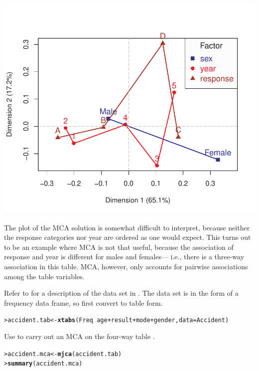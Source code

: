 \documentclass[10pt]{report}\usepackage[]{graphicx}\usepackage[]{color}
\makeatletter
\newcommand{\hlopt}[1]{\textcolor[rgb]{0,0,0}{#1}}%
\newcommand{\hlstd}[1]{\textcolor[rgb]{0.345,0.345,0.345}{#1}}%
\newcommand{\hlkwb}[1]{\textcolor[rgb]{0.69,0.353,0.396}{#1}}%
\newcommand{\hlkwc}[1]{\textcolor[rgb]{0.333,0.667,0.333}{#1}}%
\newcommand{\hlkwd}[1]{\textcolor[rgb]{0.737,0.353,0.396}{\textbf{#1}}}%
\newenvironment{kframe}{%
 \def\at@end@of@kframe{}%
 \ifinner\ifhmode%
  \def\at@end@of@kframe{\end{minipage}}%
  \begin{minipage}{\columnwidth}%
 \fi\fi%
 \def\FrameCommand##1{\hskip\@totalleftmargin \hskip-\fboxsep
 \colorbox{shadecolor}{##1}\hskip-\fboxsep
     \hskip-\linewidth \hskip-\@totalleftmargin \hskip\columnwidth}%
 \MakeFramed {\advance\hsize-\width
   \@totalleftmargin\z@ \linewidth\hsize
   \@setminipage}}%
 {\par\unskip\endMakeFramed%
 \at@end@of@kframe}
\newenvironment{knitrout}{}{} %
\renewenvironment{knitrout}{\small\renewcommand{\baselinestretch}{.85}}{} %
\makeatother
\begin{document}
\begin{Exercises}
\begin{enumerate*}
\begin{ans}
\begin{knitrout}
\centerline{\includegraphics[width=.5\textwidth]{soln/fig/ex6_11c-1} }



\end{knitrout}
    The plot of the MCA solution is somewhat difficult to interpret, because
    neither the response categories nor year are ordered as one would expect.
    This turns out to be an example where MCA is not that useful, because the association
    of response and year is different for males and females--- i.e., there is a three-way 
    association in this table. MCA, however, only accounts for pairwise associations among the
    table variables.
    \end{ans}
    
  \end{enumerate*}

\exercise\label{lab:ca-accident} Refer to  for a description of the  data set
  in . The data set is in the form of a frequency data frame, so first convert to table form.
\begin{knitrout}\footnotesize
{}\color{fgcolor}\begin{kframe}
\begin{alltt}
\hlstd{> }\hlstd{accident.tab} \hlkwb{<-} \hlkwd{xtabs}\hlstd{(Freq} \hlopt{~} \hlstd{age} \hlopt{+} \hlstd{result} \hlopt{+} \hlstd{mode} \hlopt{+} \hlstd{gender,} \hlkwc{data}\hlstd{=Accident)}
\end{alltt}
\end{kframe}
\end{knitrout}

  \begin{enumerate*}
    \item Use  to carry out an MCA on the four-way table .
    \begin{ans}
\begin{knitrout}\footnotesize
{}\color{fgcolor}\begin{kframe}
\begin{alltt}
\hlstd{> }\hlstd{accident.mca} \hlkwb{<-} \hlkwd{mjca}\hlstd{(accident.tab)}
\hlstd{> }\hlkwd{summary}\hlstd{(accident.mca)}
\end{alltt}
\begin{verbatim}


\end{verbatim}
\end{kframe}
\end{knitrout}
\end{ans}
\end{enumerate*}
\end{Exercises}
\end{document}
